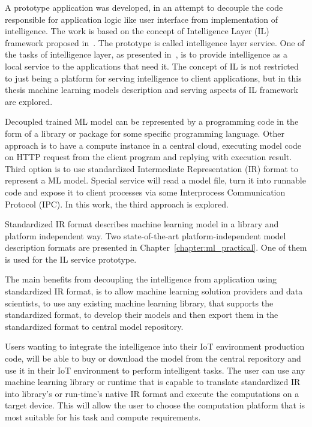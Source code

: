 \documentclass[english, 12pt, a4paper, elec, utf8, online]{aaltothesis}
\begin{document}
A prototype application was developed, in an attempt to decouple the code responsible for application logic like user interface from implementation of intelligence. The work is based on the concept of Intelligence Layer (IL) framework proposed in~\cite{edgar2019}. The prototype is called intelligence layer service. One of the tasks of intelligence layer, as presented in~\cite{edgar2019}, is to provide intelligence as a local service to the applications that need it. The concept of IL is not restricted to just being a platform for serving intelligence to client applications, but in this thesis machine learning models description and serving aspects of IL framework are explored. 


Decoupled trained ML model can be represented by a programming code in the form of a library or package for some specific programming language. Other approach is to have a compute instance in a central cloud, executing model code on HTTP request from the client program and replying with execution result. Third option is to use standardized Intermediate Representation (IR) format to represent a ML model. Special service will read a model file, turn it into runnable code and expose it to client processes via some Interprocess Communication Protocol (IPC). In this work, the third approach is explored. 
        
Standardized IR format describes machine learning model in a library and platform independent way. Two state-of-the-art platform-independent model description formats are presented in Chapter~\ref{chapter:ml_practical}. One of them is used for the IL service prototype.    

The main benefits from decoupling the intelligence from application using standardized IR format, is to allow machine learning solution providers and data scientists, to use any existing machine learning library, that supports the standardized format, to develop their models and then export them in the standardized format to central model repository.

Users wanting to integrate the intelligence into their IoT environment production code, will be able to buy or download the model from the central repository and use it in their IoT environment to perform intelligent tasks. The user can use any machine learning library or runtime that is capable to translate standardized IR into library's or run-time's native IR format and execute the computations on a target device. This will allow the user to choose the computation platform that is most suitable for his task and compute requirements.
\end{document}
